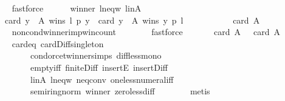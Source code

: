 \begin{isabellebody}
\ \ \ \ \ \ \isamarkupfalse%
\ fastforce\isanewline
\ \ \ \ \isamarkupfalse%
\ winner\ l{\isacharunderscore}{\kern0pt}neq{\isacharunderscore}{\kern0pt}w\ l{\isacharunderscore}{\kern0pt}in{\isacharunderscore}{\kern0pt}A\ \isamarkupfalse%
\ {}{\isacharcolon}{\kern0pt}\isanewline
\ \ \ \ \ \ {\isachardoublequoteopen}card\ {\isacharbraceleft}{\kern0pt}y\ {\isasymin}\ A{\isachardot}{\kern0pt}\ wins\ l\ p\ y{\isacharbraceright}{\kern0pt}\ {\isacharminus}{\kern0pt}\ card\ {\isacharbraceleft}{\kern0pt}y\ {\isasymin}\ A{\isachardot}{\kern0pt}\ wins\ y\ p\ l{\isacharbraceright}{\kern0pt}\ {\isasymle}\isanewline
\ \ \ \ \ \ \ \ \ \ card\ A\ {\isacharminus}{\kern0pt}{}{\isachardoublequoteclose}\isanewline
\ \ \ \ \ \ \isamarkupfalse%
\ non{\isacharunderscore}{\kern0pt}cond{\isacharunderscore}{\kern0pt}winner{\isacharunderscore}{\kern0pt}imp{\isacharunderscore}{\kern0pt}win{\isacharunderscore}{\kern0pt}count\isanewline
\ \ \ \ \ \ \isamarkupfalse%
\ fastforce\isanewline
\ \ \ \ \isamarkupfalse%
\ {}{\isacharcolon}{\kern0pt}\ {\isachardoublequoteopen}card\ A\ {\isacharminus}{\kern0pt}{}\ {\isacharless}{\kern0pt}\ card\ A\ {\isacharminus}{\kern0pt}{}{\isachardoublequoteclose}\isanewline
\ \ \ \ \ \ \isamarkupfalse%
\ card{\isacharunderscore}{\kern0pt}{}{\isacharunderscore}{\kern0pt}eq\ card{\isacharunderscore}{\kern0pt}Diff{\isacharunderscore}{\kern0pt}singleton\isanewline
\ \ \ \ \ \ \ \ \ \ \ \ condorcet{\isacharunderscore}{\kern0pt}winner{\isachardot}{\kern0pt}simps\ diff{\isacharunderscore}{\kern0pt}less{\isacharunderscore}{\kern0pt}mono{}\isanewline
\ \ \ \ \ \ \ \ \ \ \ \ empty{\isacharunderscore}{\kern0pt}iff\ finite{\isacharunderscore}{\kern0pt}Diff\ insertE\ insert{\isacharunderscore}{\kern0pt}Diff\isanewline
\ \ \ \ \ \ \ \ \ \ \ \ l{\isacharunderscore}{\kern0pt}in{\isacharunderscore}{\kern0pt}A\ l{\isacharunderscore}{\kern0pt}neq{\isacharunderscore}{\kern0pt}w\ neq{}{\isacharunderscore}{\kern0pt}conv\ one{\isacharunderscore}{\kern0pt}less{\isacharunderscore}{\kern0pt}numeral{\isacharunderscore}{\kern0pt}iff\isanewline
\ \ \ \ \ \ \ \ \ \ \ \ semiring{\isacharunderscore}{\kern0pt}norm{\isacharparenleft}{\kern0pt}{}{}{\isacharparenright}{\kern0pt}\ winner\ zero{\isacharunderscore}{\kern0pt}less{\isacharunderscore}{\kern0pt}diff\isanewline
\ \ \ \ \ \ \isamarkupfalse%
\ metis\isanewline
\ \ \ \ \isamarkupfalse%

\end{isabellebody}
